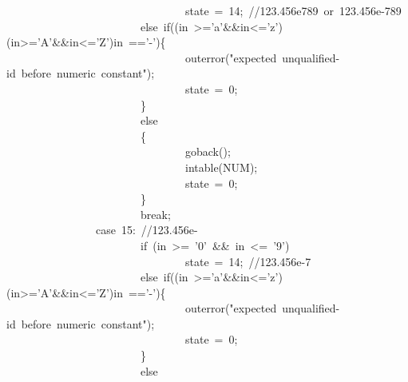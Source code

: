 \documentclass{article}
\begin{document}
\begin{mdpre}
~~~~~~~~~~~~~~~~~~~~~~~~~~~~~~~~state~=~{14};~{//123.456e789~or~123.456e-789}\\
~~~~~~~~~~~~~~~~~~~~~~~~{else}~{if}((in~\textgreater{}={'a'}\&\&in\textless{}={'z'})\textbar{}\textbar{}(in\textgreater{}={'A'}\&\&in\textless{}={'Z'})\textbar{}\textbar{}in~=={'-'})\{\\
~~~~~~~~~~~~~~~~~~~~~~~~~~~~~~~~outerror({"}{expected~unqualified-id~before~numeric~constant}{"});\\
~~~~~~~~~~~~~~~~~~~~~~~~~~~~~~~~state~=~{0};\\
~~~~~~~~~~~~~~~~~~~~~~~~\}\\
~~~~~~~~~~~~~~~~~~~~~~~~{else}\\
~~~~~~~~~~~~~~~~~~~~~~~~\{\\
~~~~~~~~~~~~~~~~~~~~~~~~~~~~~~~~goback();\\
~~~~~~~~~~~~~~~~~~~~~~~~~~~~~~~~intable({NUM});\\
~~~~~~~~~~~~~~~~~~~~~~~~~~~~~~~~state~=~{0};\\
~~~~~~~~~~~~~~~~~~~~~~~~\}\\
~~~~~~~~~~~~~~~~~~~~~~~~{break};\\
~~~~~~~~~~~~~~~~{case}~{15}:~{//123.456e-}\\
~~~~~~~~~~~~~~~~~~~~~~~~{if}~(in~\textgreater{}=~{'0'}~\&\&~in~\textless{}=~{'9'})\\
~~~~~~~~~~~~~~~~~~~~~~~~~~~~~~~~state~=~{14};~{//123.456e-7}\\
~~~~~~~~~~~~~~~~~~~~~~~~{else}~{if}((in~\textgreater{}={'a'}\&\&in\textless{}={'z'})\textbar{}\textbar{}(in\textgreater{}={'A'}\&\&in\textless{}={'Z'})\textbar{}\textbar{}in~=={'-'})\{\\
~~~~~~~~~~~~~~~~~~~~~~~~~~~~~~~~outerror({"}{expected~unqualified-id~before~numeric~constant}{"});\\
~~~~~~~~~~~~~~~~~~~~~~~~~~~~~~~~state~=~{0};\\
~~~~~~~~~~~~~~~~~~~~~~~~\}\\
~~~~~~~~~~~~~~~~~~~~~~~~{else}\\

\end{mdpre}
\end{document}
